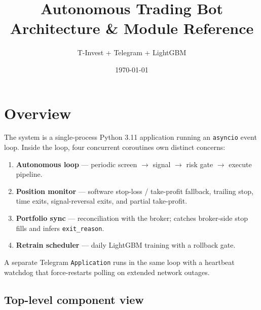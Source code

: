 \documentclass[11pt,a4paper]{article}
\title{Autonomous Trading Bot \\ \large Architecture \& Module Reference}
\author{T-Invest + Telegram + LightGBM}
\date{\today}
\begin{document}
\maketitle
\tableofcontents
\newpage

\section{Overview}

The system is a single-process Python 3.11 application running an
\texttt{asyncio} event loop. Inside the loop, four concurrent coroutines
own distinct concerns:

\begin{enumerate}
  \item \textbf{Autonomous loop} — periodic screen $\to$ signal $\to$
        risk gate $\to$ execute pipeline.
  \item \textbf{Position monitor} — software stop-loss / take-profit
        fallback, trailing stop, time exits, signal-reversal exits, and
        partial take-profit.
  \item \textbf{Portfolio sync} — reconciliation with the broker;
        catches broker-side stop fills and infers \texttt{exit\_reason}.
  \item \textbf{Retrain scheduler} — daily LightGBM training with a
        rollback gate.
\end{enumerate}

A separate Telegram \texttt{Application} runs in the same loop with a
heartbeat watchdog that force-restarts polling on extended network
outages.

\subsection{Top-level component view}
\end{document}
